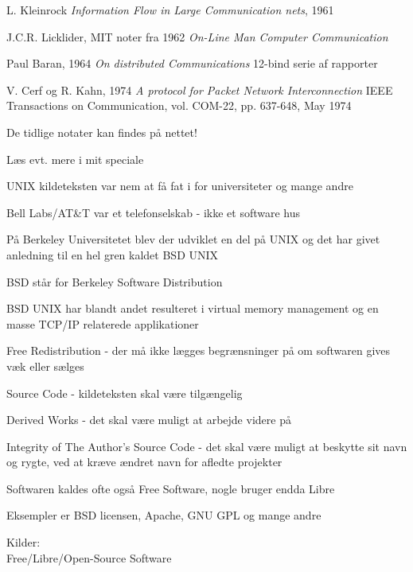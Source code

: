 \documentclass[Screen16to9,17pt,footrule]{foils}
\begin{document}

\begin{list1}
\item L. Kleinrock \emph{Information Flow in Large Communication nets}, 1961
\item J.C.R. Licklider, MIT noter fra 1962 \emph{On-Line Man Computer
  Communication}
\item Paul Baran, 1964 \emph{On distributed Communications}
12-bind serie af rapporter\\
\item V. Cerf og R. Kahn, 1974
\emph{A protocol for Packet Network Interconnection}
IEEE Transactions on Communication, vol. COM-22, pp. 637-648, May 1974
\item De tidlige notater kan findes på nettet!
\end{list1}

Læs evt. mere i mit speciale 



\begin{list1}
  \item UNIX kildeteksten var nem at få fat i for universiteter og
  mange andre
\item Bell Labs/AT\&T var et telefonselskab - ikke et software hus
\item På Berkeley Universitetet blev der udviklet en del på UNIX og
  det har givet anledning til en hel gren kaldet BSD UNIX
\item BSD står for Berkeley Software Distribution
\item BSD UNIX har blandt andet resulteret i virtual memory management
  og en masse TCP/IP relaterede applikationer
\end{list1}


\begin{list1}
\item Free Redistribution - der må ikke lægges begrænsninger på om
  softwaren gives væk eller sælges
\item Source Code - kildeteksten skal være tilgængelig
\item Derived Works - det skal være muligt at arbejde videre på
\item Integrity of The Author's Source Code - det skal være muligt at
  beskytte sit navn og rygte, ved at kræve ændret navn for
  afledte projekter
\item Softwaren kaldes ofte også Free Software, nogle bruger endda Libre
\item Eksempler er BSD licensen, Apache, GNU GPL og mange andre
\item Kilder: \\
 Free/Libre/Open-Source Software
\end{list1}
\end{document}
